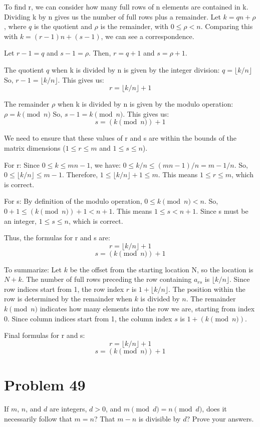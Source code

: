 \documentclass{article}
\begin{document}
To find r, we can consider how many full rows of n elements are contained in k.
Dividing k by n gives us the number of full rows plus a remainder.
Let $k = qn + \rho$, where $q$ is the quotient and $\rho$ is the remainder, with $0 \le \rho < n$.
Comparing this with $k = (r-1)n + (s-1)$, we can see a correspondence.

Let $r-1 = q$ and $s-1 = \rho$.
Then, $r = q+1$ and $s = \rho+1$.

The quotient $q$ when k is divided by n is given by the integer division:
$q = \lfloor k/n \rfloor$
So, $r-1 = \lfloor k/n \rfloor$.
This gives us:
$$r = \lfloor k/n \rfloor + 1$$

The remainder $\rho$ when k is divided by n is given by the modulo operation:
$\rho = k \pmod n$
So, $s-1 = k \pmod n$.
This gives us:
$$s = (k \pmod n) + 1$$

We need to ensure that these values of r and s are within the bounds of the matrix dimensions ($1 \le r \le m$ and $1 \le s \le n$).

For r:
Since $0 \le k \le mn - 1$, we have:
$0 \le k/n \le (mn - 1)/n = m - 1/n$.
So, $0 \le \lfloor k/n \rfloor \le m-1$.
Therefore, $1 \le \lfloor k/n \rfloor + 1 \le m$.
This means $1 \le r \le m$, which is correct.

For s:
By definition of the modulo operation, $0 \le k \pmod n < n$.
So, $0+1 \le (k \pmod n) + 1 < n+1$.
This means $1 \le s < n+1$.
Since s must be an integer, $1 \le s \le n$, which is correct.

Thus, the formulas for r and s are:
$$r = \lfloor k/n \rfloor + 1$$
$$s = (k \pmod n) + 1$$

To summarize:
Let $k$ be the offset from the starting location N, so the location is $N+k$.
The number of full rows preceding the row containing $a_{rs}$ is $\lfloor k/n \rfloor$.
Since row indices start from 1, the row index $r$ is $1 + \lfloor k/n \rfloor$.
The position within the row is determined by the remainder when $k$ is divided by $n$. The remainder $k \pmod n$ indicates how many elements into the row we are, starting from index 0.
Since column indices start from 1, the column index $s$ is $1 + (k \pmod n)$.

Final formulas for r and s:
$$r = \lfloor k/n \rfloor + 1$$
$$s = (k \pmod n) + 1$$

\newpage

\section*{Problem 49}
If $m$, $n$, and $d$ are integers, $d > 0$, and $m \pmod{d} = n \pmod{d}$, does it necessarily follow that $m=n$? That $m-n$ is divisible by $d$? Prove your answers.
\end{document}
